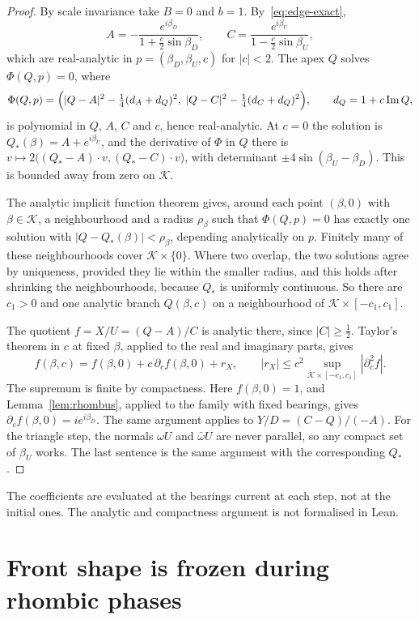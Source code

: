 \documentclass[11pt]{amsart}
\theoremstyle{definition}
\DeclareMathOperator{\Imag}{Im}
\begin{document}
\begin{proof}
By scale invariance take $B=0$ and $b=1$. By~\eqref{eq:edge-exact},
\[
A=-\frac{e^{i\beta_D}}{1+\frac c2\sin\beta_D},\qquad C=\frac{e^{i\beta_U}}{1-\frac c2\sin\beta_U},
\]
which are real-analytic in $p=(\beta_D,\beta_U,c)$ for $|c|<2$. The apex $Q$ solves $\Phi(Q,p)=0$, where
\[
\Phi(Q,p)=\Bigl(|Q-A|^2-\tfrac14(d_A+d_Q)^2,\;|Q-C|^2-\tfrac14(d_C+d_Q)^2\Bigr),\qquad d_Q=1+c\Imag Q,
\]
is polynomial in $Q$, $A$, $C$ and $c$, hence real-analytic. At $c=0$ the solution is
$Q_*(\beta)=A+e^{i\beta_U}$, and the derivative of $\Phi$ in $Q$ there is
$v\mapsto2\bigl((Q_*-A)\cdot v,(Q_*-C)\cdot v\bigr)$, with determinant $\pm4\sin(\beta_U-\beta_D)$. This is
bounded away from zero on $\mathcal K$.

The analytic implicit function theorem gives, around each point $(\beta,0)$ with $\beta\in\mathcal K$, a
neighbourhood and a radius $\rho_\beta$ such that $\Phi(Q,p)=0$ has exactly one solution with
$|Q-Q_*(\beta)|<\rho_\beta$, depending analytically on $p$. Finitely many of these neighbourhoods cover
$\mathcal K\times\{0\}$. Where two overlap, the two solutions agree by uniqueness, provided they lie within
the smaller radius, and this holds after shrinking the neighbourhoods, because $Q_*$ is uniformly
continuous. So there are $c_1>0$ and one analytic branch $Q(\beta,c)$ on a neighbourhood of
$\mathcal K\times[-c_1,c_1]$.

The quotient $f=X/U=(Q-A)/C$ is analytic there, since $|C|\ge\tfrac12$. Taylor's theorem in $c$ at fixed
$\beta$, applied to the real and imaginary parts, gives
\[
f(\beta,c)=f(\beta,0)+c\,\partial_cf(\beta,0)+r_X,\qquad |r_X|\le c^2\sup_{\mathcal K\times[-c_1,c_1]}|\partial_c^2f|.
\]
The supremum is finite by compactness. Here $f(\beta,0)=1$, and Lemma~\ref{lem:rhombus}, applied to the
family with fixed bearings, gives $\partial_cf(\beta,0)=ie^{i\beta_D}$. The same argument applies to
$Y/D=(C-Q)/(-A)$. For the triangle step, the normals $\omega U$ and $\bar\omega U$ are never parallel, so
any compact set of $\beta_U$ works. The last sentence is the same argument with the corresponding
$Q_*$.
\end{proof}

\noindent The coefficients are evaluated at the bearings current at each step, not at the initial
ones. The analytic and compactness argument is not formalised in Lean.



\section{Front shape is frozen during rhombic phases}\label{sec:frozen}
\end{document}
